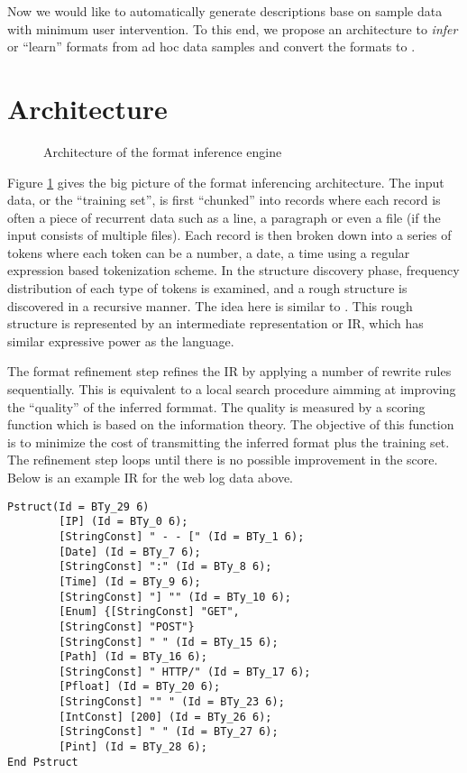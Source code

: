 \documentclass{article}
\begin{document}
Now we would like to automatically generate \padsc{} descriptions base on
sample data with minimum user intervention. To this end, 
we propose an architecture to {\em infer} or ``learn'' \cite{higuera01current} 
formats from ad hoc data samples and convert the formats to \padsc{}. 

\section{Architecture}
\begin{figure}
\begin{center}
\caption{Architecture of the format inference engine}
\label{fig-archi}
\end{center}
\end{figure}
Figure \ref{fig-archi} gives the big picture of the format inferencing
architecture. The input data, or the ``training set'', 
is first ``chunked'' into records where
each record is often a piece of recurrent data such as a line, 
a paragraph or even a file (if the input consists of multiple files).
Each record is then broken down into a series of tokens where each
token can be a number, a date, a time using a regular expression
based tokenization scheme. In the structure discovery phase,
frequency distribution of each type of tokens is examined, and
a rough structure is discovered in a recursive manner. The idea here 
is similar to \cite{arasu+:sigmod03}. This
rough structure is represented by an intermediate representation or
IR, which has similar expressive power as the \pads{} language. 

The format refinement step refines the IR by applying a number of
rewrite rules sequentially. This is equivalent to a local search
procedure aimming at improving the ``quality'' of the inferred formmat.
The quality is measured by a scoring function which is based on the
information theory. The objective of this function is to
minimize the cost of transmitting the inferred format plus the
training set. The refinement step loops until there is no possible
improvement in the score. Below is an example IR for the web log
data above.

{\small
\begin{verbatim}
Pstruct(Id = BTy_29 6)
        [IP] (Id = BTy_0 6);
        [StringConst] " - - [" (Id = BTy_1 6);
        [Date] (Id = BTy_7 6);
        [StringConst] ":" (Id = BTy_8 6);
        [Time] (Id = BTy_9 6);
        [StringConst] "] "" (Id = BTy_10 6);
        [Enum] {[StringConst] "GET", 
		[StringConst] "POST"} 
        [StringConst] " " (Id = BTy_15 6);
        [Path] (Id = BTy_16 6);
        [StringConst] " HTTP/" (Id = BTy_17 6);
        [Pfloat] (Id = BTy_20 6);
        [StringConst] "" " (Id = BTy_23 6);
        [IntConst] [200] (Id = BTy_26 6);
        [StringConst] " " (Id = BTy_27 6);
        [Pint] (Id = BTy_28 6);
End Pstruct
\end{verbatim}
}
\end{document}
